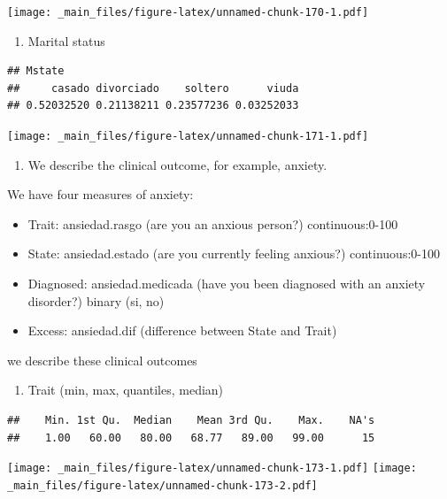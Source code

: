 \documentclass[
]{book}
\providecommand{\tightlist}{%
  \setlength{\itemsep}{0pt}\setlength{\parskip}{0pt}}
\begin{document}
\texttt{[image: \_main\_files/figure-latex/unnamed-chunk-170-1.pdf]}

\begin{enumerate}
\def\labelenumi{\alph{enumi}.}
\setcounter{enumi}{3}
\tightlist
\item
  Marital status
\end{enumerate}

\begin{verbatim}
## Mstate
##     casado divorciado    soltero      viuda 
## 0.52032520 0.21138211 0.23577236 0.03252033
\end{verbatim}

\texttt{[image: \_main\_files/figure-latex/unnamed-chunk-171-1.pdf]}

\begin{enumerate}
\def\labelenumi{\arabic{enumi}.}
\setcounter{enumi}{1}
\tightlist
\item
  We describe the clinical outcome, for example, anxiety.
\end{enumerate}

We have four measures of anxiety:

\begin{itemize}
\tightlist
\item
  Trait: ansiedad.rasgo (are you an anxious person?) continuous:0-100
\item
  State: ansiedad.estado (are you currently feeling anxious?) continuous:0-100
\item
  Diagnosed: ansiedad.medicada (have you been diagnosed with an anxiety disorder?) binary (si, no)
\item
  Excess: ansiedad.dif (difference between State and Trait)
\end{itemize}

we describe these clinical outcomes

\begin{enumerate}
\def\labelenumi{\alph{enumi}.}
\tightlist
\item
  Trait (min, max, quantiles, median)
\end{enumerate}

\begin{verbatim}
##    Min. 1st Qu.  Median    Mean 3rd Qu.    Max.    NA's 
##    1.00   60.00   80.00   68.77   89.00   99.00      15
\end{verbatim}

\texttt{[image: \_main\_files/figure-latex/unnamed-chunk-173-1.pdf]} \texttt{[image: \_main\_files/figure-latex/unnamed-chunk-173-2.pdf]}
\end{document}
